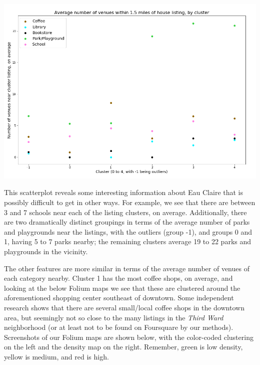 \documentclass{article}
\begin{document}
\begin{center}
\includegraphics[scale=0.4]{Avg_venues.png}
\end{center}

This scatterplot reveals some interesting information about Eau Claire that is possibly difficult to get in other ways. For example, we see that there are between 3 and 7 schools near each of the listing clusters, on average. Additionally, there are two dramatically distinct groupings in terms of the average number of parks and playgrounds near the listings, with the outliers (group -1), and groups 0 and 1, having 5 to 7 parks nearby; the remaining clusters average 19 to 22 parks and playgrounds in the vicinity. 

The other features are more similar in terms of the average number of venues of each category nearby. Cluster 1 has the most coffee shops, on average, and looking at the below Folium maps we see that these are clustered around the aforementioned shopping center southeast of downtown. Some independent research shows that there are several small/local coffee shops in the downtown area, but seemingly not so close to the many listings in the {\em Third Ward} neighborhood (or at least not to be found on Foursquare by our methods). Screenshots of our Folium maps are shown below, with the color-coded clustering on the left and the density map on the right. Remember, green is low density, yellow is medium, and red is high.
\end{document}
